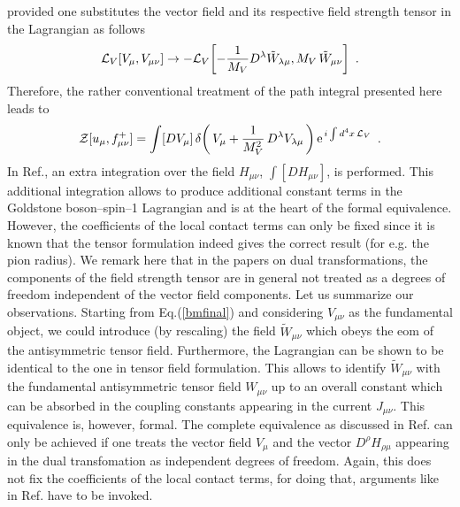 provided one substitutes the vector field and its respective field
strength tensor in the Lagrangian as follows
\begin{equation}
{\cal L}_V [V_\mu , V_{\mu \nu}] \to
-{\cal L}_V \biggl[-\frac{1}{M_V} D^\lambda \tilde{W}_{\lambda \mu}
, M_V \, \tilde W_{\mu \nu} \biggr] \, \, \, .
\label{lequiv}
\end{equation}
Therefore, the rather conventional treatment of the path integral presented
here leads to
\begin{equation}
{\cal Z}[u_\mu, f^+_{\mu \nu}]
= \int [DV_\mu] \, \delta\biggl(  \, V_\mu +\frac{1}{M_V^2} \, D^\lambda
V_{\lambda \mu} \, \biggr) \, {\rm e}^{\, i \int d^4x \, {\cal L}_V}
\, \, \, .
\label{bmfinal}
\end{equation}
In Ref.\cite{bp}, an extra integration over the field $H_{\mu \nu}$,
$\int [DH_{\mu \nu}]$, is performed.  This additional
integration allows to produce additional constant terms in the Goldstone
boson--spin--1 Lagrangian and is at the heart of the formal
equivalence. However, the coefficients of the local contact terms can
only be fixed since it is known that the tensor formulation indeed
gives the correct result (for e.g. the pion radius). We
remark here that in the papers on dual transformations, the components
of the field strength tensor are in general not treated as a degrees
of freedom independent of the vector field components.
Let us summarize our observations. Starting from
Eq.(\ref{bmfinal}) and considering $V_{\mu \nu}$ as the fundamental object, we
could introduce (by rescaling) the field ${\tilde W}_{\mu \nu}$ which
obeys the eom of
the antisymmetric tensor field. Furthermore, the Lagrangian can be shown to be
identical to the one in tensor field formulation. This allows to identify
${\tilde W}_{\mu \nu}$  with the fundamental antisymmetric tensor field
$W_{\mu \nu}$ up to an overall constant which can be absorbed in the coupling
constants appearing in
the current $J_{\mu \nu}$. This equivalence is, however, formal.
The complete equivalence as discussed in Ref.\cite{bp} can only be achieved if
one treats the vector field $V_\mu$ and the vector $D^\rho H_{\rho \mu}$
appearing in the dual transfomation as independent degrees of
freedom. Again, this does not fix the coefficients of the local
contact terms, for doing that, arguments like in Ref.\cite{reso1}
have to be invoked.

\vspace{1cm}

